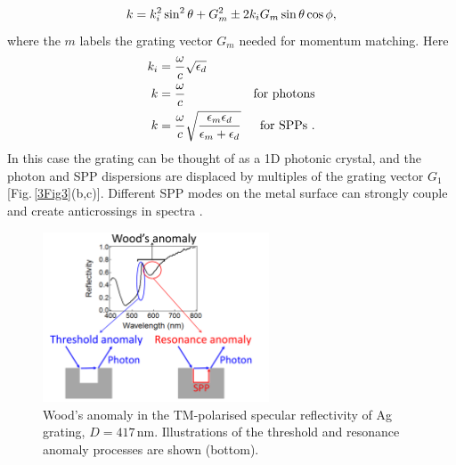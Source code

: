 \begin{equation}
\centering
k = k_i^2\sin^2\theta+G_m^2\pm2k_iG_m\sin\theta\cos\phi ,
\label{GratingDisp}
\end{equation}
where the $m$ labels the grating vector $G_m$ needed for momentum matching. Here
\begin{subequations}
\label{kmodes}
\begin{align}
\centering
k_i &= \frac{\omega}{c}\sqrt{\epsilon_d}& \\
k&=\frac{\omega}{c}& \textnormal{for photons} \label{kphot} \\
k &= \frac{\omega}{c}\sqrt{\frac{\epsilon_m\epsilon_d}{\epsilon_m+\epsilon_d}}& \textnormal{for SPPs .} \label{kspp}
\end{align}
\end{subequations}
In this case the grating can be thought of as a 1D photonic crystal, and the photon and SPP dispersions are displaced by multiples of the grating vector $G_1$ [Fig.\,\ref{3Fig3}(b,c)]. Different SPP modes on the metal surface can strongly couple and create anticrossings in spectra \cite{Chen1983}.


\begin{figure}[h!] 
\centering    
\includegraphics[width=0.6\textwidth]{Fig4}
\caption{Wood's anomaly in the TM-polarised specular reflectivity of Ag grating, $D=417$\,nm. Illustrations of the threshold and resonance anomaly processes are shown (bottom).}
\label{3Fig4}
\end{figure}

